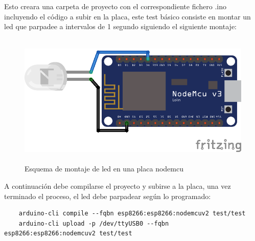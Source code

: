 Esto creara una carpeta de proyecto con el correspondiente fichero .ino incluyendo el código a subir en la placa, este test básico consiste en montar un led que parpadee a intervalos de 1 segundo siguiendo el siguiente montaje:

\begin{figure}[hbt!]
\centering
\includegraphics[height=2.5in]{figures/nodemcu-test1.png}
\caption[Montaje placa nodeMCU con led]{Esquema de montaje de led en una placa nodemcu}
    \label{figure1}
\end{figure}

A continuación debe compilarse el proyecto y subirse a la placa, una vez terminado el proceso, el led debe parpadear según lo programado:

\begin{verbatim}
    arduino-cli compile --fqbn esp8266:esp8266:nodemcuv2 test/test
    arduino-cli upload -p /dev/ttyUSB0 --fqbn esp8266:esp8266:nodemcuv2 test/test
\end{verbatim}